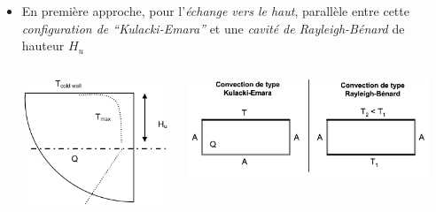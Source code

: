 \begin{frame}[fragile]
\begin{itemize}
\item En première approche, pour l'\emph{échange vers le haut}, parallèle entre cette \emph{configuration de ``Kulacki-Emara''} et une \emph{cavité de Rayleigh-Bénard} de hauteur $H_u$
\begin{columns}[T]
    \begin{column}{0.25\textwidth}
\centering \includegraphics[width=1.0\textwidth]{Figures/p11_1_Bonnet2001.png}
    \end{column}
    \begin{column}{0.5\textwidth}
\centering \includegraphics[width=1.0\textwidth]{Figures/KE_RB.png}
    \end{column}
    \begin{column}{0.25\textwidth}

\end{column}
\end{columns}
\end{itemize}
\end{frame}
